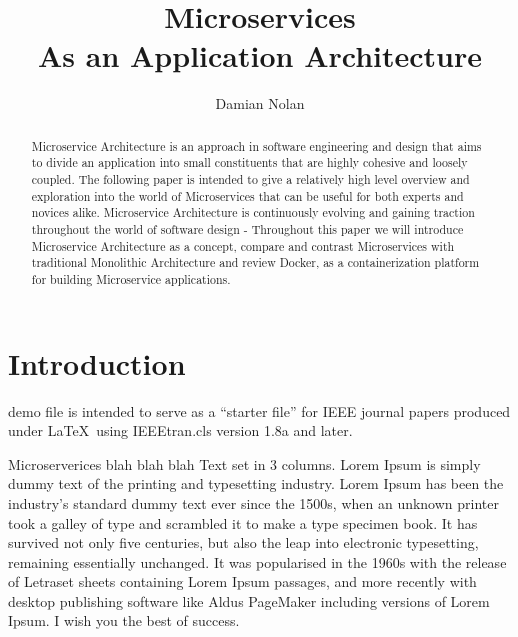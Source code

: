 \documentclass[journal]{IEEEtran}
\begin{document}
\title{Microservices \\ As an Application Architecture}


\author{ Damian Nolan }

\maketitle

\begin{abstract}
Microservice Architecture is an approach in software engineering and design that aims to divide an application into small constituents that are highly cohesive and loosely coupled. The following paper is intended to give a relatively high level overview and exploration into the world of Microservices that can be useful for both experts and novices alike. Microservice Architecture is continuously evolving and gaining traction throughout the world of software design - Throughout this paper we will introduce Microservice Architecture as a concept, compare and contrast Microservices with traditional Monolithic Architecture and review Docker, as a containerization platform for building Microservice applications.
\end{abstract}

\section{Introduction}
% 
% 
% 
% 
 demo file is intended to serve as a ``starter file''
for IEEE journal papers produced under \LaTeX\ using
IEEEtran.cls version 1.8a and later.

Microserverices blah blah blah \cite{MicroservicesResourceGuide}
Text set in 3 columns.
Lorem Ipsum is simply dummy text of the printing and typesetting industry. Lorem Ipsum has been the industry's standard dummy text ever since the 1500s, when an unknown printer took a galley of type and scrambled it to make a type specimen book. It has survived not only five centuries, but also the leap into electronic typesetting, remaining essentially unchanged. \textcite{MicroservicesResourceGuide} It was popularised in the 1960s with the release of Letraset sheets containing Lorem Ipsum passages, and more recently with desktop publishing software like Aldus PageMaker including versions of Lorem Ipsum. \cite{GOTOConference}
I wish you the best of success.
\end{document}
